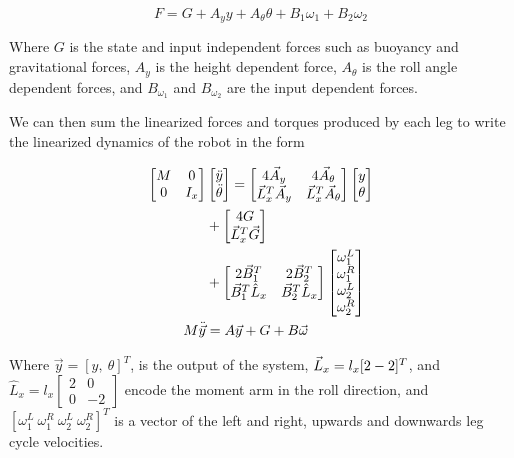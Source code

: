 \begin{equation}
    F = G + A_y y + A_{\theta} \theta + B_1 \omega_1 + B_2 \omega_2
\end{equation}

\noindent Where $G$ is the state and input independent forces such as buoyancy and gravitational forces, $A_y$ is the height dependent force, $A_{\theta}$ is the roll angle dependent forces, and $B_{\omega_1}$ and $B_{\omega_2}$ are the input dependent forces.

We can then sum the linearized forces and torques produced by each leg to write the linearized dynamics of the robot in the form

\begin{align}
    \begin{bmatrix} M & 0 \\
                    0 & I_x \end{bmatrix} 
        &
    \begin{bmatrix} \ddot{y} \\ \ddot{\theta} \end{bmatrix} =
    \begin{bmatrix} 4 \vec{A}_y & 4 \vec{A}_{\theta} \notag \\
                    \vec{L}_x^T \vec{A}_y & \vec{L}_x^T \vec{A}_{\theta} \end{bmatrix}
    \begin{bmatrix} y \\ \theta \end{bmatrix} \notag \\
    & + \begin{bmatrix} 4 G \\ \vec{L}_x^T \vec{G} \end{bmatrix}\\
    & + \begin{bmatrix} 2 \vec{B}_1^T & 2 \vec{B}_2^T \notag \\
                      \vec{B}_1^T \hat{L}_x & \vec{B}_2^T \hat{L}_x \end{bmatrix}
    \begin{bmatrix} \omega_1^L \\ \omega_1^R \\ \omega_2^L \\ \omega_2^R \end{bmatrix} \notag \\
    M \ddot{\vec{y}} &= A \vec{y} + G + B \vec{\omega} \label{eq:rob_dyn}
\end{align}

\noindent Where $\vec{y} = [y, \ \theta]^T$, is the output of the system, $\vec{L}_x = l_x [ 2 \\ -2 ]^T$, and $\hat{L}_x = l_x \begin{bmatrix} 2 & 0 \\ 0 & -2 \end{bmatrix}$ encode the moment arm in the roll direction, and $[ \omega_1^L \ \omega_1^R \ \omega_2^L \ \omega_2^R ]^T$ is a vector of the left and right, upwards and downwards leg cycle velocities. 
